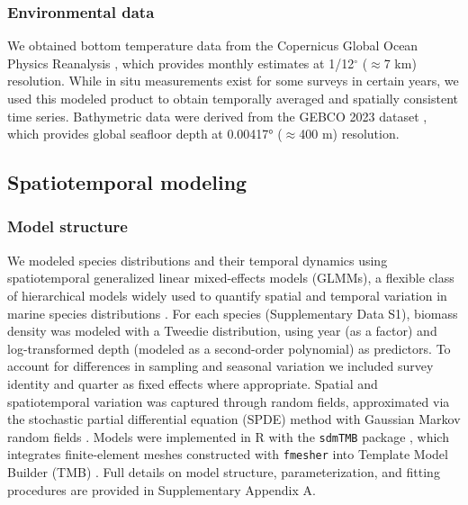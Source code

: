 \documentclass[9pt,twocolumn,twoside]{pnas-new}
\begin{document}
{\subsubsection*{Environmental data}
We obtained bottom temperature data from the Copernicus Global Ocean Physics Reanalysis \citep{european_union-copernicus_marine_service_global_2018}, which provides monthly estimates at 1/12$^{\circ}$ ($\approx$7 km) resolution. While in situ measurements exist for some surveys in certain years, we used this modeled product to obtain temporally averaged and spatially consistent time series. Bathymetric data were derived from the GEBCO 2023 dataset \citep{gebco_bathymetric_compilation_group_2023_gebco_2023_2023}, which provides global seafloor depth at 0.00417° ($\approx$400 m) resolution.

\subsection*{Spatiotemporal modeling}\label{sec:Species spatiotemporal modeling}

\subsubsection*{Model structure} 
We modeled species distributions and their temporal dynamics using spatiotemporal generalized linear mixed-effects models (GLMMs), a flexible class of hierarchical models widely used to quantify spatial and temporal variation in marine species distributions \citep{thorson_geostatistical_2015, thorson_model-based_2016}. For each species (Supplementary Data S1), biomass density was modeled with a Tweedie distribution, using year (as a factor) and log-transformed depth (modeled as a second-order polynomial) as predictors. To account for differences in sampling and seasonal variation we included survey identity and quarter as fixed effects where appropriate. Spatial and spatiotemporal variation was captured through random fields, approximated via the stochastic partial differential equation (SPDE) method with Gaussian Markov random fields \citep{lindgren_explicit_2011}. Models were implemented in R with the \texttt{sdmTMB} package \citep{sdmTMB2025}, which integrates finite-element meshes constructed with \texttt{fmesher} \citep{lindgren_fmesher_2025} into Template Model Builder (TMB) \citep{kristensen_tmb_2016}. Full details on model structure, parameterization, and fitting procedures are provided in Supplementary Appendix A.

}
\end{document}
